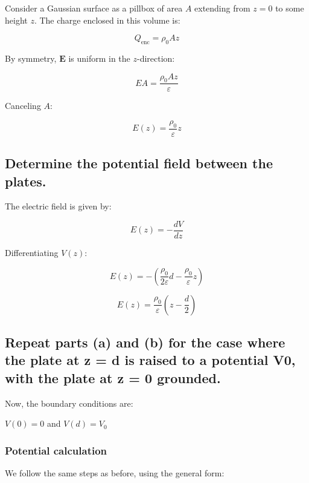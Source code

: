 \documentclass[a4paper,12pt]{article}
\begin{document}
Consider a Gaussian surface as a pillbox of area \( A \) extending from \( z = 0 \) to some height \( z \). The charge enclosed in this volume is:

\begin{equation}
Q_{\text{enc}} = \rho_0 A z
\end{equation}

By symmetry, \( \mathbf{E} \) is uniform in the \( z \)-direction:

\begin{equation}
E A = \frac{\rho_0 A z}{\varepsilon}
\end{equation}

Canceling \( A \):

\begin{equation}
\boxed{E(z) = \frac{\rho_0}{\varepsilon} z}
\end{equation}

\subsection{Determine the potential field between the plates.}
The electric field is given by:

\begin{equation}
E(z) = -\frac{dV}{dz}
\end{equation}

Differentiating \( V(z) \):

\begin{equation}
E(z) = - \left( \frac{\rho_0}{2\varepsilon} d - \frac{\rho_0}{\varepsilon} z \right)
\end{equation}

\begin{equation}
\boxed{E(z) = \frac{\rho_0}{\varepsilon} \left( z - \frac{d}{2} \right)}
\end{equation}
\subsection{Repeat parts (a) and (b) for the case where the plate at z = d is raised to a potential V0, with the plate at z = 0 grounded.}
Now, the boundary conditions are:

 \( V(0) = 0 \) and \( V(d) = V_0 \)

\subsubsection{Potential calculation}

We follow the same steps as before, using the general form:
\end{document}

